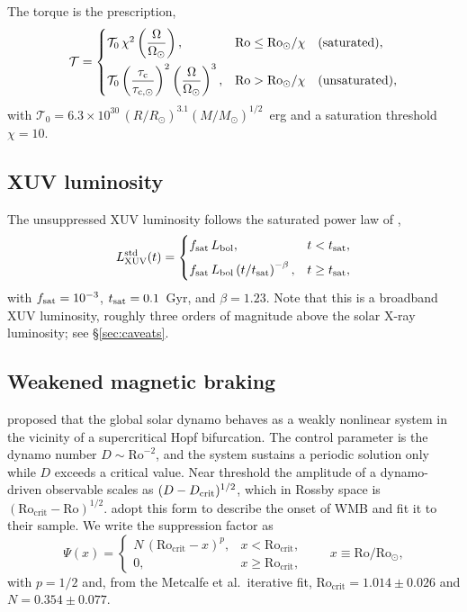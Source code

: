 \documentclass[11pt]{article}
\newcommand{\Rocrit}{\mathrm{Ro_{crit}}}
\newcommand{\Rosun}{\mathrm{Ro_\odot}}
\newcommand{\Msun}{M_\odot}
\begin{document}
The torque is the \citet{Matt15} prescription,
%
\begin{equation}
  \mathcal{T} =
  \begin{cases}
    \mathcal{T}_0\, \chi^2 \left(\dfrac{\Omega}{\Omega_\odot}\right),
      & \mathrm{Ro} \le \Rosun/\chi \quad \text{(saturated)},\\[2.2ex]
    \mathcal{T}_0
      \left(\dfrac{\tau_{\rm c}}{\tau_{{\rm c},\odot}}\right)^{2}
      \left(\dfrac{\Omega}{\Omega_\odot}\right)^{3},
      & \mathrm{Ro} > \Rosun/\chi \quad \text{(unsaturated)},
  \end{cases}
\end{equation}
%
with
$\mathcal{T}_0 = 6.3\times10^{30}\,(R/R_\odot)^{3.1}(M/\Msun)^{1/2}$~erg
and a saturation threshold $\chi = 10$.

\subsection{XUV luminosity}

The unsuppressed XUV luminosity follows the saturated power law of
\citet{Ribas05},
%
\begin{equation}
  L_{\rm XUV}^{\rm std}(t) =
  \begin{cases}
    f_{\rm sat}\, L_{\rm bol}, & t < t_{\rm sat},\\[1.2ex]
    f_{\rm sat}\, L_{\rm bol} \left(t/t_{\rm sat}\right)^{-\beta},
      & t \ge t_{\rm sat},
  \end{cases}
  \label{eq:ribas}
\end{equation}
%
with $f_{\rm sat} = 10^{-3}$, $t_{\rm sat} = 0.1$~Gyr, and $\beta = 1.23$. Note
that this is a broadband XUV luminosity, roughly three orders of magnitude
above the solar X-ray luminosity; see \S\ref{sec:caveats}.

\subsection{Weakened magnetic braking}
\label{sec:wmb}

\citet{Cameron17} proposed that the global solar dynamo behaves as a weakly
nonlinear system in the vicinity of a supercritical Hopf bifurcation. The
control parameter is the dynamo number $D \sim \mathrm{Ro}^{-2}$, and the
system sustains a periodic solution only while $D$ exceeds a critical value.
Near threshold the amplitude of a dynamo-driven observable scales as
$(D - D_{\rm crit})^{1/2}$, which in Rossby space is
$(\Rocrit - \mathrm{Ro})^{1/2}$. \citet{Metcalfe25} adopt this form to describe
the onset of WMB and fit it to their sample. We write the suppression factor as
%
\begin{equation}
  \Psi(x) =
  \begin{cases}
    N\,(\Rocrit - x)^{p}, & x < \Rocrit,\\[1.2ex]
    0, & x \ge \Rocrit,
  \end{cases}
  \qquad x \equiv \mathrm{Ro}/\Rosun,
  \label{eq:psi}
\end{equation}
%
with $p = 1/2$ and, from the Metcalfe et al.\ iterative fit,
$\Rocrit = 1.014 \pm 0.026$ and $N = 0.354 \pm 0.077$.
\end{document}
